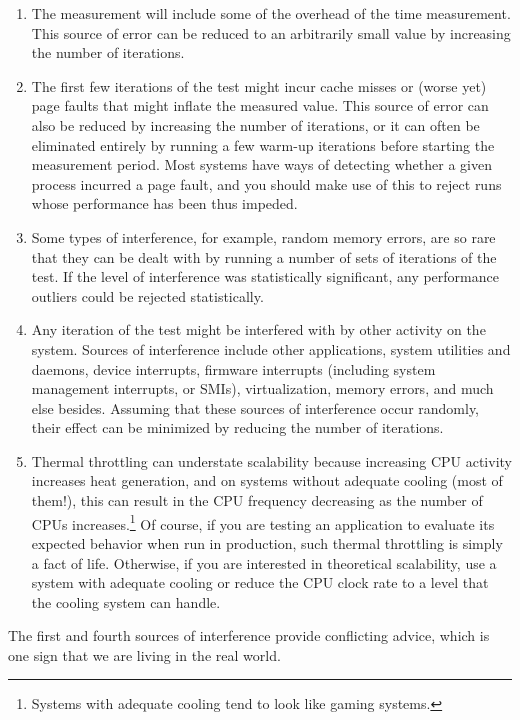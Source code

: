 \begin{enumerate}
\item	The measurement will include some of the overhead of
	the time measurement.
	This source of error can be reduced to an arbitrarily small
	value by increasing the number of iterations.
\item	The first few iterations of the test might incur cache misses
	or (worse yet) page faults that might inflate the measured
	value.
	This source of error can also be reduced by increasing the
	number of iterations, or it can often be eliminated entirely
	by running a few warm-up iterations before starting the
	measurement period.
	Most systems have ways of detecting whether a given process
	incurred a page fault, and you should make use of this to
	reject runs whose performance has been thus impeded.
\item	Some types of interference, for example, random memory errors,
	are so rare that they can be dealt with by running a number
	of sets of iterations of the test.
	If the level of interference was statistically significant,
	any performance outliers could be rejected statistically.
\item	Any iteration of the test might be interfered with by other
	activity on the system.
	Sources of interference include other applications, system
	utilities and daemons, device interrupts, firmware interrupts
	(including system management interrupts, or SMIs),
	virtualization, memory errors, and much else besides.
	Assuming that these sources of interference occur randomly,
	their effect can be minimized by reducing the number of
	iterations.
\item	Thermal throttling can understate scalability because increasing
	CPU activity increases heat generation, and on systems without
	adequate cooling (most of them!), this can result in the CPU
	frequency decreasing as the number of CPUs increases.\footnote{
		Systems with adequate cooling tend to look like gaming systems.}
	Of course, if you are testing an application to evaluate its
	expected behavior when run in production, such thermal throttling
	is simply a fact of life.
	Otherwise, if you are interested in theoretical scalability,
	use a system with adequate cooling or reduce the CPU clock rate
	to a level that the cooling system can handle.
\end{enumerate}

The first and fourth sources of interference provide conflicting advice,
which is one sign that we are living in the real world.

